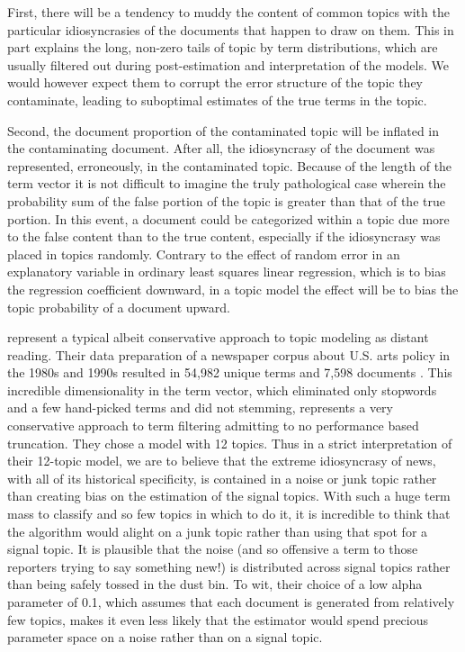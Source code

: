 \documentclass[]{book}
\theoremstyle{definition}
\theoremstyle{definition}
\theoremstyle{definition}
\theoremstyle{remark}
\begin{document}
First, there will be a tendency to muddy the content of common topics
with the particular idiosyncrasies of the documents that happen to draw
on them. This in part explains the long, non-zero tails of topic by term
distributions, which are usually filtered out during post-estimation and
interpretation of the models. We would however expect them to corrupt
the error structure of the topic they contaminate, leading to suboptimal
estimates of the true terms in the topic.

Second, the document proportion of the contaminated topic will be
inflated in the contaminating document. After all, the idiosyncrasy of
the document was represented, erroneously, in the contaminated topic.
Because of the length of the term vector it is not difficult to imagine
the truly pathological case wherein the probability sum of the false
portion of the topic is greater than that of the true portion. In this
event, a document could be categorized within a topic due more to the
false content than to the true content, especially if the idiosyncrasy
was placed in topics randomly. Contrary to the effect of random error in
an explanatory variable in ordinary least squares linear regression,
which is to bias the regression coefficient downward, in a topic model
the effect will be to bias the topic probability of a document upward.

\citet{DiMaggio2013Exploiting} represent a typical albeit conservative
approach to topic modeling as distant reading. Their data preparation of
a newspaper corpus about U.S. arts policy in the 1980s and 1990s
resulted in 54,982 unique terms and 7,598 documents
\citeyearpar[582]{DiMaggio2013Exploiting}. This incredible
dimensionality in the term vector, which eliminated only stopwords and a
few hand-picked terms and did not stemming, represents a very
conservative approach to term filtering admitting to no performance
based truncation. They chose a model with 12 topics. Thus in a strict
interpretation of their 12-topic model, we are to believe that the
extreme idiosyncrasy of news, with all of its historical specificity, is
contained in a noise or junk topic rather than creating bias on the
estimation of the signal topics. With such a huge term mass to classify
and so few topics in which to do it, it is incredible to think that the
algorithm would alight on a junk topic rather than using that spot for a
signal topic. It is plausible that the noise (and so offensive a term to
those reporters trying to say something new!) is distributed across
signal topics rather than being safely tossed in the dust bin. To wit,
their choice of a low alpha parameter of 0.1, which assumes that each
document is generated from relatively few topics, makes it even less
likely that the estimator would spend precious parameter space on a
noise rather than on a signal topic.
\end{document}
